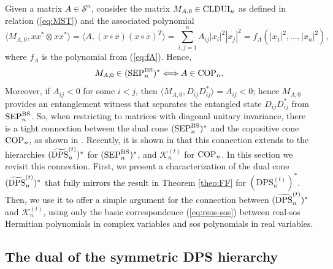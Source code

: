 \documentclass[11pt]{article}
\newcommand{\MS}{{\mathcal S}}
\newcommand{\MK}{{\mathcal K}}
\newcommand{\SEP}{\text{\rm SEP}}
\newcommand{\COP}{\text{\rm COP}}
\newcommand{\CLDUI}{\text{\rm CLDUI}}
\newcommand{\DPS}{\text{\rm DPS}}
\newcommand{\DPSt}{\mathrm{DPS}^{(t)}}
\newcommand{\SEPBS}{\SEP^{\BS}}
\newcommand{\tilDPS}{\widetilde {\DPS}}
\newcommand{\tilDPSt}{\widetilde{\DPS}^{(t)}}
\newcommand{\ot}{\otimes}
\newcommand{\BS}{\text{\rm BS}}
\newcommand{\ovx}{\overline x}
\theoremstyle{plain}
\begin{document}
Given a matrix $A\in\MS^n$, consider the matrix $M_{A,0}\in \CLDUI_n$
as defined in relation (\ref{eq:MST}) and the associated polynomial 
$$\langle M_{A,0}, xx^*\ot xx^*\rangle 
=\langle A, (x\circ \ovx)(x\circ \ovx)^T\rangle= \sum_{i,j=1}^n A_{ij} |x_i|^2|x_j|^2 = f_A(|x_1|^2,\ldots,|x_n|^2),
$$
where $f_A$ is the polynomial from (\ref{eq:fA}). Hence, 
$$M_{A,0}\in (\SEPBS_n)^* \Longleftrightarrow A\in \COP_n.$$
Moreover,  if $A_{ij}<0$ for some $i<j$, then $\langle M_{A,0}, D_{ij}D_{ij}^*\rangle = A_{ij}<0$; hence  $M_{A,0}$ provides an entanglement witness that  separates the entangled state $D_{ij}D_{ij}^*$ from $\SEPBS_n$. 
So, when restricting to matrices with diagonal unitary invariance, there is a tight connection between the dual cone $(\SEPBS_n)^*$ and the copositive cone $\COP_n$, as   shown  in   \cite[Theorem 2.1]{Marconi_2021}. 
Recently, it is shown in \cite{GNP_2025}  that this connection extends to  the hierarchies  {$(\tilDPSt_n)^*$} for $(\SEPBS_n)^*$, and $\MK^{(t)}_n$ for $\COP_n$. In this section we revisit this connection. First, we present a characterization of the dual cone  {$(\tilDPSt_n)^*$} that fully mirrors the result  in Theorem \ref{theo:FF} for $(\DPSt_n)^*$. Then, we use it to offer a  simple argument for the connection between  {$(\tilDPS_n^{(t)})^*$} and  {$\MK^{(t)}_n$}, using only the basic correspondence   (\ref{eq:rsos-sos}) between real-sos Hermitian polynomials in complex variables  and sos polynomials in real variables.

\subsection{The dual of the symmetric  DPS hierarchy }\label{sec:DPStil}
\end{document}
